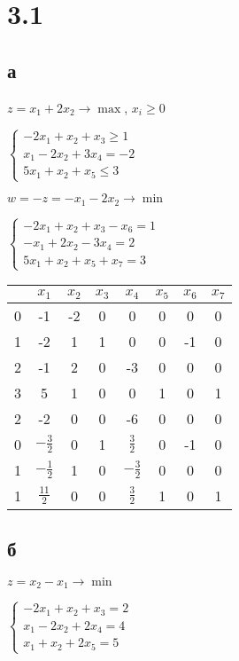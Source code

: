 \documentclass[russian]{article}
\begin{document}
\section*{3.1}

\subsection*{а}

$z=x_1 + 2 x_2 \to \max$, $x_i \ge 0$

$\begin{cases}
-2 x_1 + x_2 + x_3 \ge 1 \\
x_1 - 2 x_2 + 3 x_4 = -2 \\
5 x_1 + x_2 + x_5 \le 3
\end{cases}$

$w=-z=-x_1 - 2 x_2 \to \min$

$\begin{cases}
-2 x_1 + x_2 + x_3 - x_6 = 1\\
-x_1 + 2 x_2 - 3 x_4 = 2 \\
5 x_1 + x_2 + x_5 + x_7 = 3
\end{cases}$

\begin{tabular}{|c|ccccccc|}\hline
& $x_1$ & $x_2$ & $x_3$ & $x_4$ & $x_5$ & $x_6$ & $x_7$ \\\hline

0 & -1 & -2 & 0 & 0 & 0 & 0 & 0 \\
1 & -2 & 1 & 1 & 0 & 0 & -1 & 0 \\
2 & -1 & 2 & 0 & -3 & 0 & 0 & 0 \\
3 & 5 & 1 & 0 & 0 & 1 & 0 & 1 \\\hline

2 & -2 & 0 & 0 & -6 & 0 & 0 & 0 \\
0 & $-\frac{3}{2}$ & 0 & 1 & $\frac{3}{2}$ & 0 & -1 & 0 \\
1 & $-\frac{1}{2}$ & 1 & 0 & $-\frac{3}{2}$ & 0 & 0 & 0 \\
1 & $\frac{11}{2}$ & 0 & 0 & $\frac{3}{2}$ & 1 & 0 & 1 \\\hline

\end{tabular}

\subsection*{б}

$z = x_2 - x_1 \to \min$

$\begin{cases}
-2 x_1 + x_2 + x_3 = 2 \\
x_1 - 2x_2 + 2 x_4 = 4 \\
x_1 + x_2 + 2 x_5 = 5
\end{cases}$
\end{document}
